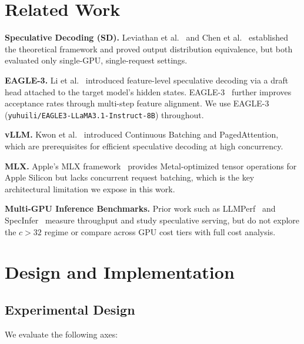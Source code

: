 \documentclass[10pt,twocolumn]{article}
\begin{document}
\section{Related Work}
\label{sec:related}

\textbf{Speculative Decoding (SD).}  Leviathan et al.~\cite{leviathan2023fast} and
Chen et al.~\cite{chen2023accelerating} established the theoretical framework and
proved output distribution equivalence, but both evaluated only single-GPU,
single-request settings.

\textbf{EAGLE-3.}  Li et al.~\cite{li2024eagle} introduced feature-level
speculative decoding via a draft head attached to the target model's hidden states.
EAGLE-3~\cite{li2025eagle3}
further improves acceptance rates through multi-step feature alignment.  We use
EAGLE-3 (\texttt{yuhuili/EAGLE3-LLaMA3.1-Instruct-8B}) throughout.

\textbf{vLLM.}  Kwon et al.~\cite{kwon2023vllm} introduced Continuous Batching and
PagedAttention, which are prerequisites for efficient speculative decoding at high
concurrency.

\textbf{MLX.}  Apple's MLX framework~\cite{mlx2023} provides Metal-optimized tensor
operations for Apple Silicon but lacks concurrent request batching, which is the
key architectural limitation we expose in this work.

\textbf{Multi-GPU Inference Benchmarks.}  Prior work such as
LLMPerf~\cite{llmperf} and SpecInfer~\cite{miao2024specinfer} measure throughput
and study speculative serving, but do not explore the $c > 32$ regime or compare
across GPU cost tiers with full cost analysis.

\section{Design and Implementation}
\label{sec:design}

\subsection{Experimental Design}

We evaluate the following axes:
\end{document}
